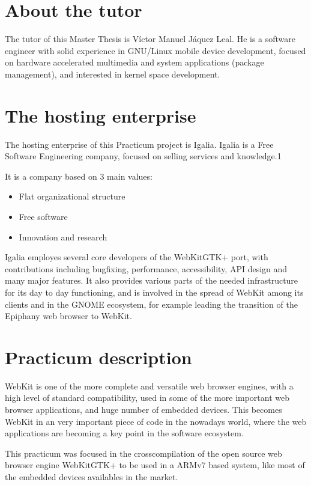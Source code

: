 \documentclass[a4paper,11pt,openany]{report}
\begin{document}
\section{About the tutor}
The tutor of this Master Thesis is V\'ictor Manuel J\'aquez Leal. He is a software engineer with solid experience in GNU/Linux mobile device development, focused on hardware accelerated multimedia and system applications (package management), and interested in kernel space development.

\section{The hosting enterprise}
The hosting enterprise of this Practicum project is Igalia\cite{igalia}. Igalia is a Free Software Engineering company, focused on selling services and knowledge.1

It is a company based on 3 main values:

\begin{itemize}
\item Flat organizational structure 
\item Free software
\item Innovation and research
\end{itemize}

Igalia employes several core developers of the WebKitGTK+ port, with contributions including bugfixing, performance, accessibility, API design and many major features. It also provides various parts of the needed infrastructure for its day to day functioning, and is involved in the spread of WebKit among its clients and in the GNOME ecosystem, for example leading the transition of the Epiphany web browser to WebKit.

\section{Practicum description}
WebKit is one of the more complete and versatile web browser engines, with a high level of standard compatibility, used in some of the more important web browser applications, and huge number of embedded devices. This becomes WebKit in an very important piece of code in the nowadays world, where the web applications are becoming a key point in the software ecosystem.

This practicum was focused in the crosscompilation of the open source web browser engine WebKitGTK+ to be used in a ARMv7 based system, like most of the embedded devices availables in the market. 
\end{document}
